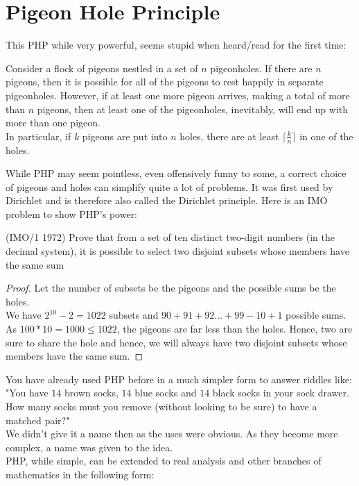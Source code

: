 \section{Pigeon Hole Principle}
This PHP while very powerful, seems stupid when heard/read for the first time:
\begin{theorem}
    Consider a flock of pigeons nestled in a set of $n$ pigeonholes. If there are $n$ pigeons, then it is possible for all of the pigeons to rest happily in separate pigeonholes. However, if at least one more pigeon arrives, making a total of more than $n$ pigeons, then at least one of the pigeonholes, inevitably, will end up with more than one pigeon.\\
    In particular, if $k$ pigeons are put into $n$ holes, there are at least $\lceil \frac{k}{n} \rceil$ in one of the holes.
\end{theorem}
While PHP may seem pointless, even offensively funny to some, a correct choice of pigeons and holes can simplify quite a lot of problems. It was first used by Dirichlet and is therefore also called the Dirichlet principle. Here is an IMO problem to show PHP's power:\\
\begin{example}
    (IMO/1 1972) Prove that from a set of ten distinct two-digit numbers (in the decimal system), it is possible to select two disjoint subsets whose members have the same sum
\end{example}
\begin{proof}
    Let the number of subsets be the pigeons and the possible sums be the holes. \\
    We have $2^{10} -2 =1022$ subsets and $90+91+92 \dots +99 - 10 + 1$ possible sums. As $100*10=1000 \leq 1022$, the pigeons are far less than the holes. Hence, two are sure to share the hole and hence, we will always have two disjoint subsets whose members have the same sum.
\end{proof}
You have already used PHP before in a much simpler form to answer riddles like: "You have $14$ brown socks, $14$ blue socks and $14$ black socks in your sock drawer. How many socks must you remove (without looking to be sure) to have a matched pair?"\\
We didn't give it a name then as the uses were obvious. As they become more complex, a name was given to the idea.\\
PHP, while simple,  can be extended to real analysis and other branches of mathematics in the following form:\\
